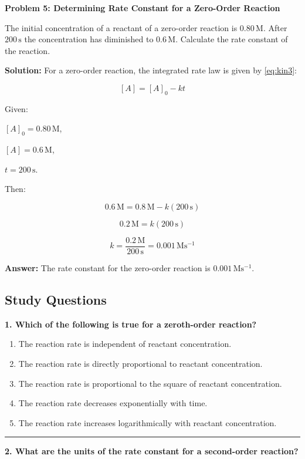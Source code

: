\documentclass[
  9pt,
]{extbook}
\providecommand{\tightlist}{%
  \setlength{\itemsep}{0pt}\setlength{\parskip}{0pt}}
\theoremstyle{definition}
\theoremstyle{definition}
\theoremstyle{definition}
\theoremstyle{definition}
\theoremstyle{remark}
\begin{document}
\textbf{Problem 5: Determining Rate Constant for a Zero-Order Reaction}

The initial concentration of a reactant of a zero-order reaction is \(0.80\,\text{M}\). After \(200\,\text{s}\) the concentration has diminished to \(0.6\,\text{M}\). Calculate the rate constant of the reaction.

\textbf{Solution:} For a zero-order reaction, the integrated rate law is given by \eqref{eq:kin3}:

\[[A] = [A]_0 - kt\]

Given:

\([A]_0 = 0.80\,\text{M}\),

\([A] = 0.6\,\text{M}\),

\(t=200\,\text{s}\).

Then:

\[0.6\,\text{M} = 0.8\,\text{M} - k(200\,\text{s})\]

\[0.2\,\text{M} = k(200\,\text{s})\]

\[k = \frac{0.2\,\text{M}}{200\,\text{s}} = 0.001\,\text{M}\text{s}^{-1}\]

\textbf{Answer:} The rate constant for the zero-order reaction is \(0.001\,\text{M}\text{s}^{-1}\).

\subsection{Study Questions}\label{quest15}

\textbf{1. Which of the following is true for a zeroth-order reaction?}

\begin{enumerate}
\def\labelenumi{\alph{enumi}.}
\tightlist
\item
  The reaction rate is independent of reactant concentration.
\item
  The reaction rate is directly proportional to reactant concentration.
\item
  The reaction rate is proportional to the square of reactant concentration.
\item
  The reaction rate decreases exponentially with time.
\item
  The reaction rate increases logarithmically with reactant concentration.
\end{enumerate}

\begin{center}\rule{0.5\linewidth}{0.5pt}\end{center}

\textbf{2. What are the units of the rate constant for a second-order reaction?}
\end{document}
